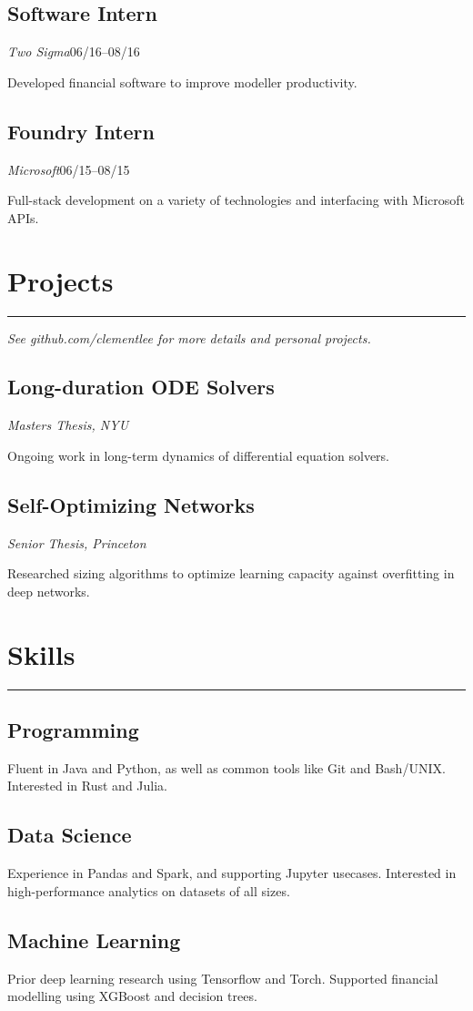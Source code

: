 \documentclass[11pt]{article}
\begin{document}
  \subsection*{Software Intern}
  \emph{Two Sigma}\hfill 06/16--08/16

  Developed financial software to improve modeller productivity.

  \subsection*{Foundry Intern}
  \emph{Microsoft}\hfill 06/15--08/15

  Full-stack development on a variety of technologies and interfacing with Microsoft APIs.

\section*{\sc Projects}
\hrule
  \emph{See github.com/clementlee for more details and personal projects.}

  \subsection*{Long-duration ODE Solvers}
  \hfill\emph{Masters Thesis, NYU}

  Ongoing work in long-term dynamics of differential equation solvers.
  
  \subsection*{Self-Optimizing Networks}
  \hfill\emph{Senior Thesis, Princeton}

  Researched sizing algorithms to optimize learning capacity against overfitting in deep networks.


\section*{\sc Skills}
\hrule

  \subsection*{Programming}

  Fluent in Java and Python, as well as common tools like Git and Bash/UNIX.
  Interested in Rust and Julia.

  \subsection*{Data Science}

  Experience in Pandas and Spark, and supporting Jupyter usecases.
  Interested in high-performance analytics on datasets of all sizes.

  \subsection*{Machine Learning}

  Prior deep learning research using Tensorflow and Torch.
  Supported financial modelling using XGBoost and decision trees.
\end{document}
